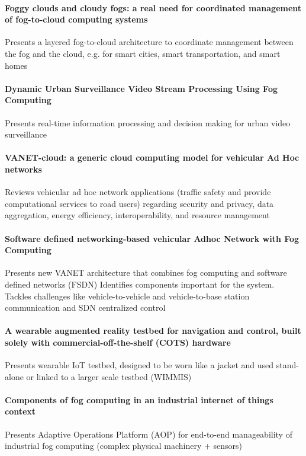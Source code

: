 \paragraph{Foggy clouds and cloudy fogs: a real need for coordinated management of fog-to-cloud computing systems}\cite{masip-bruin_foggy_2016}
Presents a layered fog-to-cloud architecture to coordinate management between the fog and the cloud, e.g. for smart cities, smart transportation, and smart homes

\paragraph{Dynamic Urban Surveillance Video Stream Processing Using Fog Computing} \cite{chen_dynamic_2016}
Presents real-time information processing and decision making for urban video surveillance

\paragraph{VANET-cloud: a generic cloud computing model for vehicular Ad Hoc networks} \cite{bitam_vanet-cloud:_2015}
Reviews vehicular ad hoc network applications (traffic safety and provide computational services to road users) regarding
security and privacy, data aggregation, energy efficiency, interoperability, and resource management

\paragraph{Software defined networking-based vehicular Adhoc Network with Fog Computing} \cite{truong_software_2015}
Presents new VANET architecture that combines fog computing and software defined networks (FSDN)
Identifies components important for the system. Tackles challenges like vehicle-to-vehicle and vehicle-to-base station communication and SDN centralized control

\paragraph{A wearable augmented reality testbed for navigation and control, built solely with commercial-off-the-shelf (COTS) hardware} \cite{behringer_wearable_2000}
Presents wearable IoT testbed, designed to be worn like a jacket and used stand-alone or linked to a larger scale testbed (WIMMIS)

\paragraph{Components of fog computing in an industrial internet of things context}\cite{gazis_components_2015}
Presents Adaptive Operations Platform (AOP) for end-to-end manageability of industrial fog computing (complex physical machinery + sensors)

